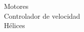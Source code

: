
\begin{description}

\item[Motores]

\item[Controlador de velocidad]

\item[Hélices]


\end{description}
	
